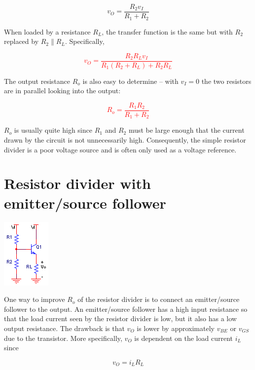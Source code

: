\begin{equation}
v_{O} = \frac{R_2 v_{I}}{R_1 + R_2}
\end{equation}

When loaded by a resistance $R_{L}$, the transfer function is the same but with $R_2$ replaced by $R_2 \parallel R_{L}$. Specifically,

\textcolor{red}{
\begin{equation}
v_{O} = \frac{R_2 R_{L}v_{I}}{R_1(R_2 + R_{L})+R_2 R_{L}}
\end{equation}
}

The output resistance $R_{o}$ is also easy to determine -- with $v_{I} = 0$ the two resistors are in parallel looking into the output:

\textcolor{red}{
\begin{equation}
R_{o} = \frac{R_1 R_2}{R_1 + R_2}
\end{equation}
}

$R_{o}$ is usually quite high since $R_1$ and $R_2$ must be large enough that the current drawn by the circuit is not unnecessarily high. Consequently, the simple resistor divider is a poor voltage source and is often only used as a voltage reference.

\section{Resistor divider with emitter/source follower}
\begin{center}
	\includegraphics{schematics/resistordivider_emitterfollower.PNG}
\end{center}

One way to improve $R_{o}$ of the resistor divider is to connect an emitter/source follower to the output.
An emitter/source follower has a high input resistance so that the load current seen by the resistor divider is low, but it also has a low output resistance.
The drawback is that $v_{O}$ is lower by approximately $v_{BE}$ or $v_{GS}$ due to the transistor.
More specifically, $v_{O}$ is dependent on the load current $i_{L}$ since

\begin{equation}
v_{O} = i_{L}R_{L}
\end{equation}

